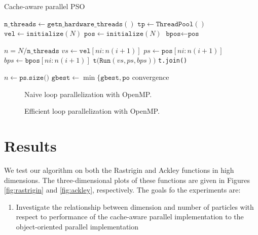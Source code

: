 \begin{algorithm}
  \caption{Cache-aware parallel PSO}\label{alg:par-pso}
  \begin{algorithmic}[1]
    \State $\texttt{n\_threads} \gets \texttt{getn\_hardware\_threads}()$
    \State $\texttt{tp} \gets \texttt{ThreadPool}()$
    \State $\texttt{vel} \gets \texttt{initialize}(N)$
    \State $\texttt{pos} \gets \texttt{initialize}(N)$
    \State $\texttt{bpos} \gets \texttt{pos}$

    \State $n = N/\texttt{n\_threads}$ 
    \State $vs \gets \texttt{vel}[ni:n(i+1)]$
    \State $ps \gets \texttt{pos}[ni:n(i+1)]$
    \State $bps \gets \texttt{bpos}[ni:n(i+1)]$
    \State $\texttt{t(Run}(vs, ps, bps))$
    \EndFor
    \State \texttt{t.join()}
    \EndFor
    \EndProcedure
  \end{algorithmic}
  \begin{algorithmic}[1]
    \State $n \gets \texttt{ps.size()}$
    \Repeat
    \State $\texttt{gbest} \gets \min\{\texttt{gbest}, \texttt{po}$
    \EndFor
    \State 
    \EndFor
    \Until convergence
    \EndProcedure
  \end{algorithmic}
\end{algorithm}

\begin{figure}
  
  \caption{Naive loop parallelization with OpenMP.}\label{fig:naive-par}
\end{figure}

\begin{figure}
  
  \caption{Efficient loop parallelization with OpenMP.}\label{fig:efficient-par}
\end{figure}

\section{Results}\label{sec:results}
We test our algorithm on both the Rastrigin \cite{rastrigin} and Ackley \cite{ackley} functions
in high dimensions. The three-dimensional plots of these functions are given in Figures
\ref{fig:rastrigin} and \ref{fig:ackley}, respectively.  The goals fo the
experiments are:
\begin{enumerate}
  \item Investigate the relationship between dimension and number of particles
    with respect to performance of the cache-aware parallel implementation to
    the object-oriented parallel implementation
\end{enumerate}

